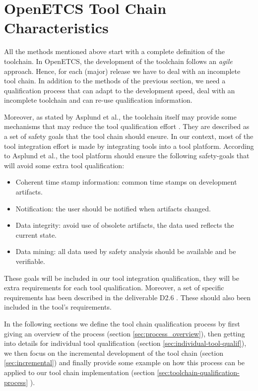\section{OpenETCS Tool Chain Characteristics}
\label{sec:toolchain-analysis}

All the methods mentioned above start with a complete definition of the toolchain. In OpenETCS, the development of the toolchain follows an \emph{agile} approach.
Hence, for each (major) release we have to deal with an incomplete tool
chain. In addition to the methods of the previous section,  we need a qualification
process that can adapt to the development speed, deal with an incomplete toolchain
and can re-use qualification information.


Moreover, as stated by Asplund et al., the toolchain itself may
provide some mechanisms that may reduce the tool qualification effort
\cite{asplund_towards_2012,asplund_qualifying_2012}. They are
described as a set of safety goals that the tool chain should ensure.
 In our context, most of the
tool integration effort is made by integrating tools into a tool
platform.  According to Asplund et al., the tool platform should
ensure the following safety-goals that will avoid some extra tool qualification:
\begin{itemize}
\item Coherent time stamp information: common time stamps on development artifacts.
\item Notification: the user should be notified when artifacts changed.
\item Data integrity:  avoid use of obsolete artifacts, the data used reflects the
  current state.
\item Data mining: all data used by safety analysis should be available and be
  verifiable.
\end{itemize}

These goals will be included in our tool integration
qualification, they will be extra requirements for each tool qualification.
Moreover, a set of specific requirements has been described in the
deliverable D2.6 \cite{baro_d2.6_2013}. These should also been
included in the tool's requirements.

In the following sections we define the tool chain qualification
process by first giving an overview of the process (section
\ref{sec:process_overview}), then getting into details for individual
tool qualification (section \ref{sec:individual-tool-qualif}), we then
focus on the incremental development of the tool chain (section
\ref{sec:incremental}) and finally provide some example on how this process can be applied to our tool
chain implementation (section \ref{sec:toolchain-qualification-process} ).

